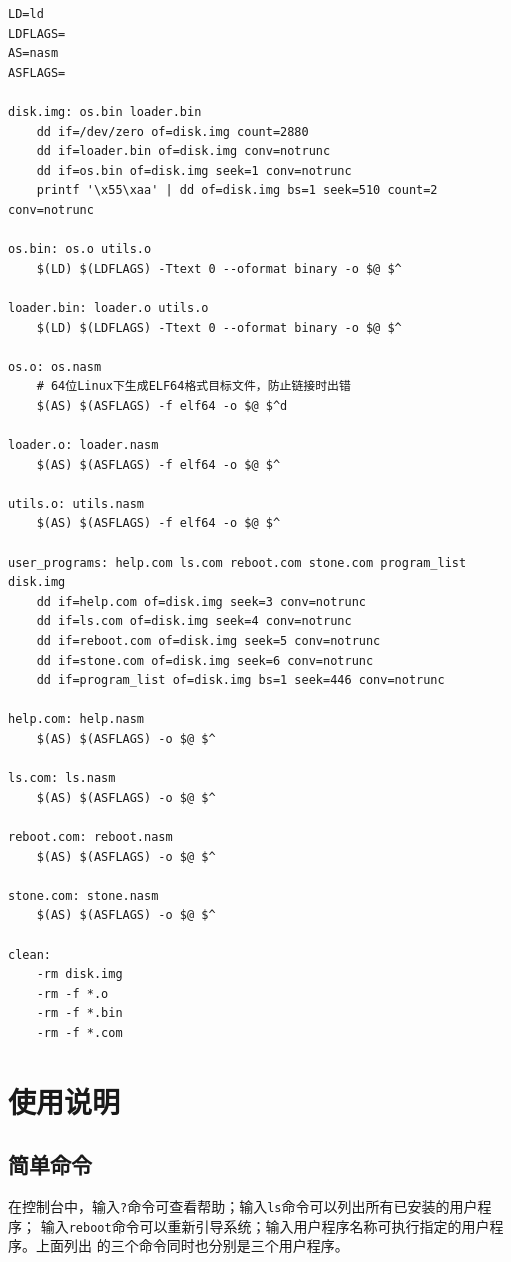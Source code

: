 \documentclass[adobefonts, a4paper]{ctexart}
\begin{document}
\begin{verbatim}
LD=ld
LDFLAGS=
AS=nasm
ASFLAGS=

disk.img: os.bin loader.bin
    dd if=/dev/zero of=disk.img count=2880
    dd if=loader.bin of=disk.img conv=notrunc
    dd if=os.bin of=disk.img seek=1 conv=notrunc
    printf '\x55\xaa' | dd of=disk.img bs=1 seek=510 count=2 conv=notrunc

os.bin: os.o utils.o
    $(LD) $(LDFLAGS) -Ttext 0 --oformat binary -o $@ $^

loader.bin: loader.o utils.o
    $(LD) $(LDFLAGS) -Ttext 0 --oformat binary -o $@ $^

os.o: os.nasm
    # 64位Linux下生成ELF64格式目标文件，防止链接时出错
    $(AS) $(ASFLAGS) -f elf64 -o $@ $^d

loader.o: loader.nasm
    $(AS) $(ASFLAGS) -f elf64 -o $@ $^

utils.o: utils.nasm
    $(AS) $(ASFLAGS) -f elf64 -o $@ $^

user_programs: help.com ls.com reboot.com stone.com program_list disk.img
    dd if=help.com of=disk.img seek=3 conv=notrunc
    dd if=ls.com of=disk.img seek=4 conv=notrunc
    dd if=reboot.com of=disk.img seek=5 conv=notrunc
    dd if=stone.com of=disk.img seek=6 conv=notrunc
    dd if=program_list of=disk.img bs=1 seek=446 conv=notrunc

help.com: help.nasm
    $(AS) $(ASFLAGS) -o $@ $^

ls.com: ls.nasm
    $(AS) $(ASFLAGS) -o $@ $^

reboot.com: reboot.nasm
    $(AS) $(ASFLAGS) -o $@ $^

stone.com: stone.nasm
    $(AS) $(ASFLAGS) -o $@ $^

clean:
    -rm disk.img
    -rm -f *.o
    -rm -f *.bin
    -rm -f *.com
\end{verbatim}

\section{使用说明}\label{usage}
\subsection{简单命令}
在控制台中，输入\verb|?|命令可查看帮助；输入\verb|ls|命令可以列出所有已安装的用户程序；
输入\verb|reboot|命令可以重新引导系统；输入用户程序名称可执行指定的用户程序。上面列出
的三个命令同时也分别是三个用户程序。
\end{document}
